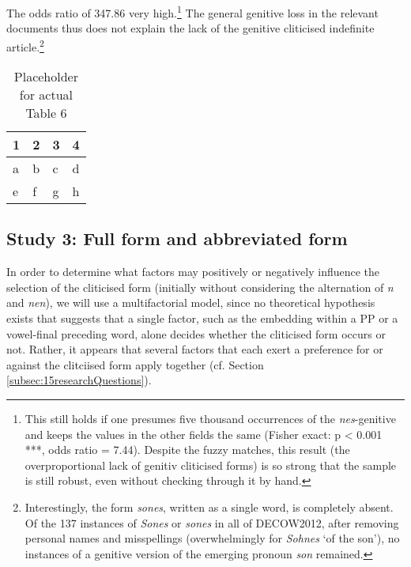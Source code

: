 The odds ratio of 347.86 very high.\footnote{
	This still holds if one presumes five thousand occurrences of the \textit{nes}-genitive and keeps the values in the other fields the same (Fisher exact: p < 0.001 ***, odds ratio = 7.44).
	Despite the fuzzy matches, this result (the overproportional lack of genitiv cliticised forms) is so strong that the sample is still robust, even without checking through it by hand.}
The general genitive loss in the relevant documents thus does not explain the lack of the genitive cliticised indefinite article.\footnote{
	\label{fn:22} Interestingly, the form \textit{sones}, written as a single word, is completely absent.
	Of the 137 instances of \textit{Sones} or \textit{sones} in all of DECOW2012, after removing personal names and misspellings (overwhelmingly for \textit{Sohnes} `of the son'), no instances of a genitive version of the emerging pronoun \textit{son} remained.}

\begin{table}
	\centering
	\begin{tabular}{llll}
		\toprule
		\textbf{1} & \textbf{2} & \textbf{3} & \textbf{4} \\
		\midrule
		a & b & c & d \\
		e & f & g & h \\
		\bottomrule
	\end{tabular}
	\caption{Placeholder for actual Table 6}
	\label{tab:0006}
\end{table}

\subsection{Study 3: Full form and abbreviated form}
\label{subsec:25s3FullFormAbbrevForm}

In order to determine what factors may positively or negatively influence the selection of the cliticised form (initially without considering the alternation of \textit{n} and \textit{nen}), we will use a multifactorial model, since no theoretical hypothesis exists that suggests that a single factor, such as the embedding within a PP or a vowel-final preceding word, alone decides whether the cliticised form occurs or not.
Rather, it appears that several factors that each exert a preference for or against the clitciised form apply together (cf. Section \ref{subsec:15researchQuestions}).


